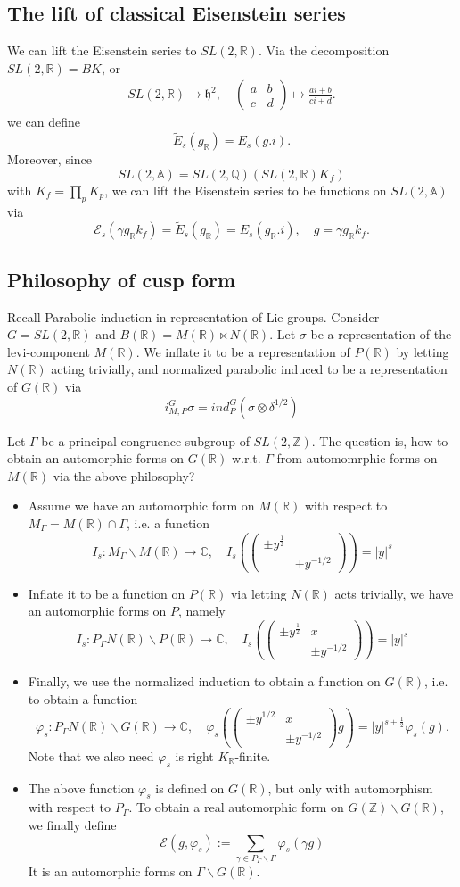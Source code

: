 \documentclass[11pt,reqno]{amsart}
\newcommand{\bna}{\begin{eqnarray*}}
\newcommand{\ena}{\end{eqnarray*}}
\newcommand{\bma}{\begin{pmatrix}}
\newcommand{\ema}{\end{pmatrix}}
\def\C{\mathbb{C}}
\def\A{\mathbb{A}}
\def\R{\mathbb{R}}
\def\Q{\mathbb{Q}}
\def\Z{\mathbb{Z}}
\theoremstyle{definition}
\newcommand{\bit}{\begin{itemize}}
\newcommand{\eit}{\end{itemize}}
\begin{document}
\subsection{The lift of classical Eisenstein series}
We can lift the Eisenstein series to $SL(2,\R)$.
Via the decomposition $SL(2,\R)=BK$, or
\bna
SL(2,\R)\rightarrow\mathfrak h^2,\quad \bma a&b\\c&d\ema\mapsto \frac{ai+b}{ci+d}.
\ena
we can define
$$
\tilde E_s(g_\R)=E_s(g.i).
$$
Moreover, since $$SL(2,\A)=SL(2,\Q)(SL(2,\R)K_f)$$ with $K_f=\prod_p K_p$,
we can lift the Eisenstein series to be functions on $SL(2,\A)$ via
$$
\mathcal E_s(\gamma g_\R k_f)= \tilde E_s(g_\R)=E_s(g_\R.i),\quad g=\gamma g_\R k_f.
$$

\subsection{Philosophy of cusp form}
Recall Parabolic induction in representation of Lie groups.
Consider $G=SL(2,\R)$ and $B(\R)=M(\R)\ltimes N(\R)$.
Let $\sigma$  be a representation of the levi-component $M(\R)$. We inflate it to be a representation of $P(\R)$ by letting $N(\R)$
acting trivially,  and normalized parabolic induced to be a representation of $G(\R)$ via
$$
i_{M,P}^G \sigma=ind_{P}^G(\sigma\otimes\delta^{1/2})
$$

Let $\Gamma$ be a principal  congruence  subgroup of $SL(2,\Z)$.
The question is,
how to obtain an automorphic forms on $G(\R)$ w.r.t. $\Gamma$ from automomrphic forms on $M(\R)$ via the above philosophy?
\bit
\item
Assume we have an automorphic form on $M(\R)$ with respect to $M_\Gamma=M(\R)\cap \Gamma$, i.e. a function
$$
I_s:M_\Gamma\backslash M(\R)\rightarrow \C,\quad I_s\left(\bma \pm y^{\frac{1}{2}}\\&\pm y^{-1/2}\ema \right)= |y|^s
$$
\item Inflate it to be a function on $P(\R)$ via letting $N(\R)$ acts trivially,
we have an automorphic forms on $P$, namely
$$
I_s:P_\Gamma N(\R)\backslash P(\R)\rightarrow \C,\quad I_s\left(\bma \pm y^{\frac{1}{2}}&x\\&\pm y^{-1/2}\ema\right)= |y|^s
$$
\item Finally, we use the normalized induction to obtain a function on $G(\R)$, i.e. to obtain a function
$$
\varphi_s: P_\Gamma N(\R)\backslash G(\R)\rightarrow\C,\quad \varphi_s\left(\bma \pm y^{1/2}&x\\&\pm y^{-1/2}\ema g\right)=|y|^{s+\frac{1}{2}}\varphi_s(g).
$$
Note that we also need $\varphi_s$ is right $K_\R$-finite.
\item The above function $\varphi_s$ is defined on $G(\R)$, but only with automorphism with respect to $P_\Gamma$.
To obtain a real automorphic form on $G(\Z)\backslash G(\R)$, we finally define
$$
\mathcal E(g,\varphi_s):=\sum_{\gamma\in P_\Gamma\backslash \Gamma}\varphi_s(\gamma g)
$$
It is an automorphic forms on $\Gamma\backslash G(\R)$.
\eit
\end{document}
